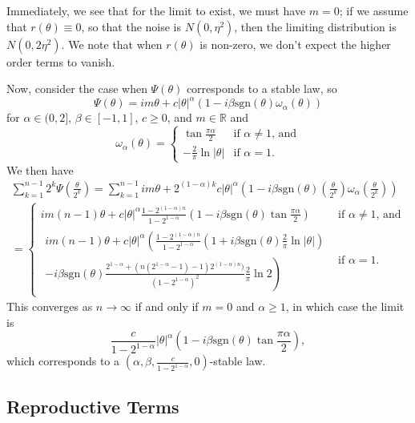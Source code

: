 \documentclass{article}
\theoremstyle{remark}
\theoremstyle{definition}
\begin{document}
Immediately, we see that for the limit to exist, we must have $m = 0$; if we assume that $r(\theta) \equiv 0$, so that the noise is $N(0,\eta^{2})$, then the limiting distribution is $N(0,2\eta^{2})$. We note that when  $r(\theta)$ is non-zero, we don't expect the higher order terms to vanish.

Now, consider the case when $\Psi(\theta)$ corresponds to a stable law, so
\[
	\Psi(\theta) = im\theta + c|\theta|^{\alpha} (1-i\beta \text{sgn}(\theta)\omega_{\alpha}(\theta))
\]
for $\alpha \in (0,2]$, $\beta \in [-1,1]$, $c \geq 0$, and $m \in \mathbb{R}$ and
\[
	\omega_{\alpha}(\theta) = \begin{cases}
		\tan{\frac{\pi\alpha}{2}} & \text{if $\alpha \neq 1$, and}\\
		-\frac{2}{\pi}\ln{|\theta|} & \text{if $\alpha = 1$.}
	\end{cases}
\]
We then have
\begin{multline*}
	 \sum_{k=1}^{n-1}  {\textstyle 2^{k} \Psi\left(\frac{\theta}{2^{k}}\right)}
	 =  \sum_{k=1}^{n-1} im\theta + 2^{(1-\alpha)k} c|\theta|^{\alpha} {\textstyle\left(1-i \beta\text{sgn}(\theta)\left(\frac{\theta}{2^{k}}\right)
	 	 \omega_{\alpha}\left(\frac{\theta}{2^{k}}\right)\right)}\\
	= 
	\begin{cases}
		 im(n-1)\theta + c|\theta|^{\alpha}\frac{1-2^{(1-\alpha)n}}{1-2^{1-\alpha}}\left(1-i\beta \text{sgn}(\theta) \tan{\frac{\pi\alpha}{2}}\right) & \text{if $\alpha \neq 1$, and}\\	
		 \begin{multlined}
		 im(n-1)\theta + c|\theta|^{\alpha}  \left(\frac{1-2^{(1-\alpha)n}}{1-2^{1-\alpha}}
		 \left(1+i \beta \text{sgn}(\theta)\frac{2}{\pi}\ln{|\theta|} \right)\right.\\
		\left. -i\beta \text{sgn}(\theta) \frac{2^{1-\alpha} + (n(2^{1-\alpha}-1)-1)2^{(1-\alpha)n})}{(1-2^{1-\alpha})^{2}}\frac{2}{\pi}\ln{2}
		\right)    
		\end{multlined}
		& \text{if $\alpha = 1$.}
	\end{cases}
\end{multline*}
This converges as $n \to \infty$ if and only if $m = 0$ and $\alpha \ge 1$, in which case the limit is 
\[
	 \frac{c}{1-2^{1-\alpha}}|\theta|^{\alpha}\left(1-i\beta \text{sgn}(\theta) \tan{\frac{\pi\alpha}{2}}\right), 
\]
which corresponds to a $\left(\alpha,\beta, \frac{c}{1-2^{1-\alpha}},0\right)$-stable law.

\subsection{Reproductive Terms}
\end{document}
